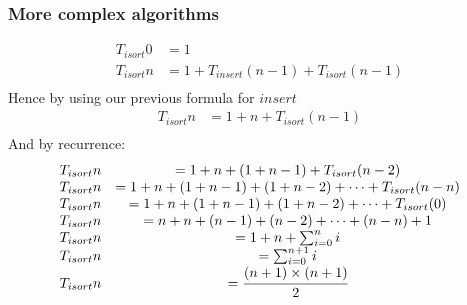 \documentclass{report}
\begin{document}
\subsubsection*{More complex algorithms}
\[\begin{matrix}
		T_{isort} 0 & = 1                                    \\
		T_{isort} n & = 1 + T_{insert}(n-1) + T_{isort}(n-1) \\
	\end{matrix}\]
Hence by using our previous formula for $insert$
\[\begin{matrix}
		T_{isort} n & = 1 + n + T_{isort}(n-1) \\
	\end{matrix}\]
And by recurrence:
\[\begin{matrix}
		T_{isort} n & = 1 + n + (1 + n - 1) + T_{isort}(n-2)                       \\
		T_{isort} n & = 1 + n + (1 + n - 1) + (1 + n - 2) + \dots + T_{isort}(n-n) \\
		T_{isort} n & = 1 + n + (1 + n - 1) + (1 + n - 2) + \dots + T_{isort}(0)   \\
		T_{isort} n & = n + n + (n - 1) + (n - 2) + \dots + (n-n) + 1              \\
		T_{isort} n & = 1 + n + \sum_{i = 0}^n{i}                                  \\
		T_{isort} n & =  \sum_{i = 0}^{n+1}{i}                                     \\
		T_{isort} n & =  \cfrac{(n+1)\times(n+1)}{2}                               \\
	\end{matrix}\]
\end{document}
